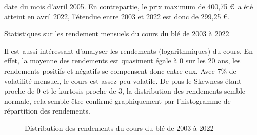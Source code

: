 date du mois d'avril 2005. En contrepartie, le prix maximum de 400,75 \euro\ a été atteint en avril 2022, l'étendue entre 2003 et 2022 est donc de 299,25 \euro. 
\begin{table}[H]
    \centering
    \caption{Statistiques sur les rendement mensuels du cours du blé de 2003 à 2022}
    \sffamily
    
\end{table}
Il est aussi intéressant d'analyser les rendements (logarithmiques) du cours. En effet, la moyenne des rendements est quasiment égale à 0 sur les 20 ans, les rendements
positifs et négatifs se compensent donc entre eux. Avec 7\% de volatilité mensuel, le cours est assez peu volatile. De plus le Skewness étant proche de 0 et le kurtosis 
proche de 3, la distribution des rendements semble normale, cela semble être confirmé graphiquement par l'histogramme de répartition des rendements.
\begin{figure}[H]
    \centering
    \label{fig:ble_rendement}
    \resizebox{\textwidth}{!}{}
    \caption{Distribution des rendements du cours du blé de 2003 à 2022}
\end{figure}
